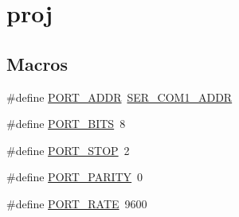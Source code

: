\hypertarget{group__proj}{}\section{proj}
\label{group__proj}
\subsection*{Macros}
\begin{DoxyCompactItemize}
\item 
\#define \hyperlink{group__proj_ga698fc99ce97e8051ede3e8e9c9baaaf1}{P\+O\+R\+T\+\_\+\+A\+D\+DR}~\hyperlink{group__ser__port_ga98199cd85fbe47b9a741b07762260422}{S\+E\+R\+\_\+\+C\+O\+M1\+\_\+\+A\+D\+DR}
\item 
\#define \hyperlink{group__proj_ga108355009766d90bac37c294fad39ca5}{P\+O\+R\+T\+\_\+\+B\+I\+TS}~8
\item 
\#define \hyperlink{group__proj_ga31b06d45be51d1c232d4cb34be4d385b}{P\+O\+R\+T\+\_\+\+S\+T\+OP}~2
\item 
\#define \hyperlink{group__proj_gaf868e5bf4fd27a5f53de530ce879dee4}{P\+O\+R\+T\+\_\+\+P\+A\+R\+I\+TY}~0
\item 
\#define \hyperlink{group__proj_gaa892a49ac9cab99bd99907f48a535b72}{P\+O\+R\+T\+\_\+\+R\+A\+TE}~9600
\end{DoxyCompactItemize}
